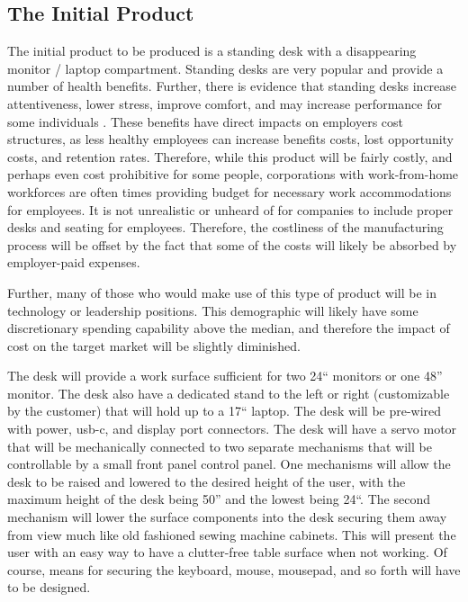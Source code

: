 \documentclass[man]{apa7}
\begin{document}
\subsection{The Initial Product}
\label{sec:orga8df23d}

The initial product to be produced is a standing desk with a disappearing monitor / laptop compartment. Standing desks are very popular and provide a number of health benefits.  Further, there is evidence that standing desks increase attentiveness, lower stress, improve comfort, and may increase performance for some individuals \parencite{frostPatternAttentionStress2020}. These benefits have direct impacts on employers cost structures, as less healthy employees can increase benefits costs, lost opportunity costs, and retention rates. Therefore, while this product will be fairly costly, and perhaps even cost prohibitive for some people, corporations with work-from-home workforces are often times providing budget for necessary work accommodations for employees. It is not unrealistic or unheard of for companies to include proper desks and seating for employees. Therefore, the costliness of the manufacturing process will be offset by the fact that some of the costs will likely be absorbed by employer-paid expenses.

Further, many of those who would make use of this type of product will be in technology or leadership positions. This demographic will likely have some discretionary spending capability above the median, and therefore the impact of cost on the target market will be slightly diminished.

The desk will provide a work surface sufficient for two 24`` monitors or one 48'' monitor. The desk also have a dedicated stand to the left or right (customizable by the customer) that will hold up to a 17`` laptop. The desk will be pre-wired with power, usb-c, and display port connectors. The desk will have a servo motor that will be mechanically connected to two separate mechanisms that will be controllable by a small front panel control panel. One mechanisms will allow the desk to be raised and lowered to the desired height of the user, with the maximum height of the desk being 50'' and the lowest being 24``. The second mechanism will lower the surface components into the desk securing them away from view much like old fashioned sewing machine cabinets. This will present the user with an easy way to have a clutter-free table surface when not working. Of course, means for securing the keyboard, mouse, mousepad, and so forth will have to be designed.
\end{document}
